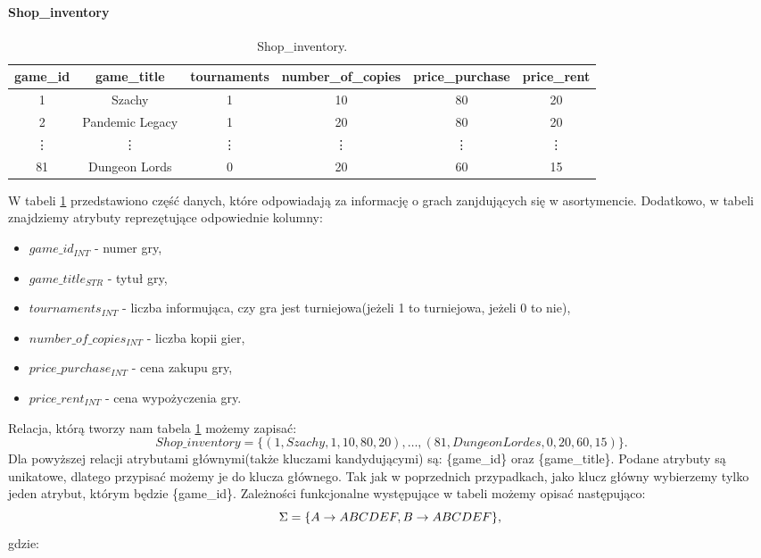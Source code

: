 \documentclass{article}
\theoremstyle{break}
\begin{document}
	\paragraph{Shop\_inventory}
	\begin{table}[!ht]
		\centering
		\begin{tabular}{|c|c|c|c|c|c|}
			\hline
			game\_id & game\_title & tournaments & number\_of\_copies & price\_purchase & price\_rent \\ \hline
			1 & Szachy & 1 & 10 & 80 & 20 \\ \hline
			2 & Pandemic Legacy & 1 & 20 & 80 & 20 \\ \hline
			\vdots & \vdots & \vdots & \vdots & \vdots & \vdots  \\ \hline
			81 & Dungeon Lords & 0 & 20 & 60 & 15 \\ \hline
		\end{tabular}
		\caption{Shop\_inventory.}
		\label{table:shop_inventory}
	\end{table}
	W tabeli \ref{table:shop_inventory} przedstawiono część danych, które odpowiadają za informację o grach zanjdujących się w asortymencie. Dodatkowo, w tabeli znajdziemy atrybuty reprezętujące odpowiednie kolumny:
	\begin{itemize}
		\item $game\_id_{INT}$ - numer gry,
		\item $game\_title_{STR}$ - tytuł gry,
		\item $tournaments_{INT}$ - liczba informująca, czy gra jest turniejowa(jeżeli 1 to turniejowa, jeżeli 0 to nie),
		\item $number\_of\_copies_{INT}$ - liczba kopii gier,
		\item $price\_purchase_{INT}$ - cena zakupu gry,
		\item $price\_rent_{INT}$ - cena wypożyczenia gry.
	\end{itemize}
	Relacja, którą tworzy nam tabela \ref{table:shop_inventory} możemy zapisać:
	$$Shop\_inventory = \{(1,Szachy,1,10,80,20),\dots , (81,Dungeon Lordes, 0 ,20,60,15)\}.$$
	Dla powyższej relacji atrybutami głównymi(także kluczami kandydującymi) są: \{game\_id\} oraz \{game\_title\}. Podane atrybuty są unikatowe, dlatego przypisać możemy je do klucza głównego. Tak jak w poprzednich przypadkach, jako klucz główny wybierzemy tylko jeden atrybut, którym będzie \{game\_id\}. Zależności funkcjonalne występujące w tabeli możemy opisać następująco:
	$$ \Sigma = \{A \rightarrow ABCDEF, B \rightarrow ABCDEF\}, \\ $$
	gdzie:
\end{document}

